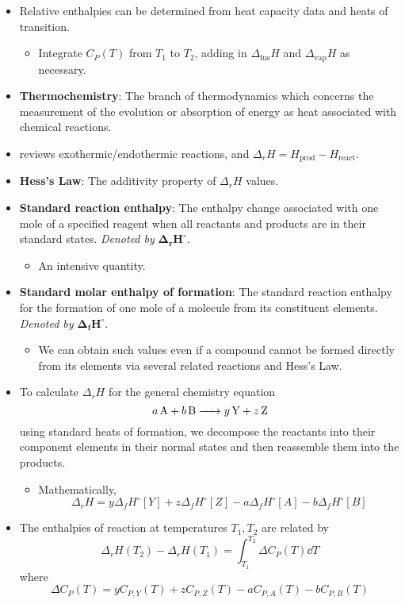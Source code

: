 \documentclass[../notes.tex]{subfiles}
\begin{document}
\begin{itemize}
    \item Relative enthalpies can be determined from heat capacity data and heats of transition.
    \begin{itemize}
        \item Integrate $C_P(T)$ from $T_1$ to $T_2$, adding in $\Delta_\text{fus}H$ and $\Delta_\text{vap}H$ as necessary.
    \end{itemize}
    \item \textbf{Thermochemistry}: The branch of thermodynamics which concerns the measurement of the evolution or absorption of energy as heat associated with chemical reactions.
    \item \textcite{bib:McQuarrieSimon} reviews exothermic/endothermic reactions, and $\Delta_rH=H_\text{prod}-H_\text{react}$.
    \item \textbf{Hess's Law}: The additivity property of $\Delta_rH$ values.
    \item \textbf{Standard reaction enthalpy}: The enthalpy change associated with one mole of a specified reagent when all reactants and products are in their standard states. \emph{Denoted by} $\bm{\Delta_rH^\circ}$.
    \begin{itemize}
        \item An intensive quantity.
    \end{itemize}
    \item \textbf{Standard molar enthalpy of formation}: The standard reaction enthalpy for the formation of one mole of a molecule from its constituent elements. \emph{Denoted by} $\bm{\Delta_fH^\circ}$.
    \begin{itemize}
        \item We can obtain such values even if a compound cannot be formed directly from its elements via several related reactions and Hess's Law.
    \end{itemize}
    \item To calculate $\Delta_rH$ for the general chemistry equation
    \begin{equation*}
        \ce{$a$A + $b$B -> $y$Y + $z$Z}
    \end{equation*}
    using standard heats of formation, we decompose the reactants into their component elements in their normal states and then reassemble them into the products.
    \begin{itemize}
        \item Mathematically,
        \begin{equation*}
            \Delta_rH = y\Delta_fH^\circ[Y]+z\Delta_fH^\circ[Z]-a\Delta_fH^\circ[A]-b\Delta_fH^\circ[B]
        \end{equation*}
    \end{itemize}
    \item The enthalpies of reaction at temperatures $T_1,T_2$ are related by
    \begin{equation*}
        \Delta_rH(T_2)-\Delta_rH(T_1) = \int_{T_1}^{T_2}\Delta C_P(T)\dd{T}
    \end{equation*}
    where
    \begin{equation*}
        \Delta C_P(T) = yC_{P,Y}(T)+zC_{P,Z}(T)-aC_{P,A}(T)-bC_{P,B}(T)
    \end{equation*}
\end{itemize}
\end{document}
